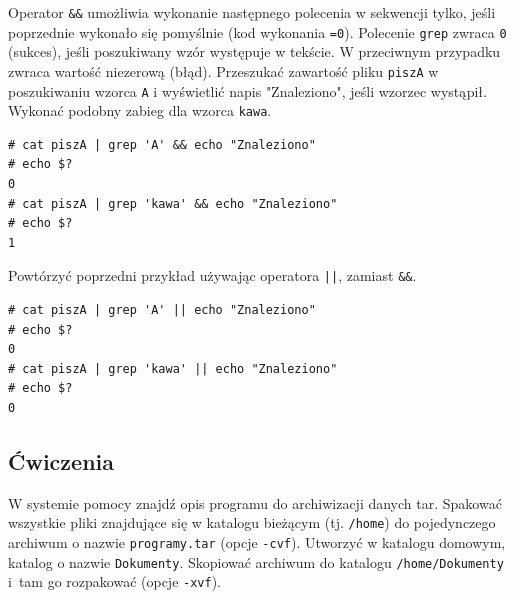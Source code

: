 \begin{example} 
Operator \lstinline[style=MyBashStyle]{&&} umożliwia wykonanie następnego polecenia w sekwencji tylko, jeśli poprzednie wykonało się pomyślnie (kod wykonania \lstinline[style=MyBashStyle]{=0}). Polecenie \lstinline[style=MyBashStyle]{grep} zwraca \lstinline[style=MyBashStyle]{0} (sukces), jeśli poszukiwany wzór występuje w tekście. W przeciwnym przypadku zwraca wartość niezerową (błąd). Przeszukać zawartość pliku \lstinline[style=MyBashStyle]{piszA} w poszukiwaniu wzorca \lstinline[style=MyBashStyle]{A} i wyświetlić napis "Znaleziono", jeśli wzorzec wystąpił. Wykonać podobny zabieg dla wzorca \lstinline[style=MyBashStyle]{kawa}.

\begin{lstlisting}[style=MyBashStyle] 
# cat piszA | grep 'A' && echo "Znaleziono"
# echo $?
0
# cat piszA | grep 'kawa' && echo "Znaleziono"
# echo $?
1
\end{lstlisting}
\end{example}

\begin{example} 
Powtórzyć poprzedni przykład używając operatora \lstinline[style=MyBashStyle]{||}, zamiast \lstinline[style=MyBashStyle]{&&}. 
\begin{lstlisting}[style=MyBashStyle] 
# cat piszA | grep 'A' || echo "Znaleziono"
# echo $?
0
# cat piszA | grep 'kawa' || echo "Znaleziono"
# echo $?
0
\end{lstlisting}
\end{example}

\subsection{Ćwiczenia} 

\begin{myenumerate}
\item W systemie pomocy znajdź opis programu do archiwizacji danych tar. Spakować wszystkie pliki znajdujące się w katalogu bieżącym (tj. \lstinline[style=MyBashStyle]{/home}) do pojedynczego archiwum o nazwie \lstinline[style=MyBashStyle]{programy.tar} (opcje \lstinline[style=MyBashStyle]{-cvf}). Utworzyć w katalogu domowym, katalog o nazwie \lstinline[style=MyBashStyle]{Dokumenty}. Skopiować archiwum do katalogu \lstinline[style=MyBashStyle]{/home/Dokumenty} i~tam go rozpakować (opcje \lstinline[style=MyBashStyle]{-xvf}). 
\end{myenumerate}

\cleardoublepage 
